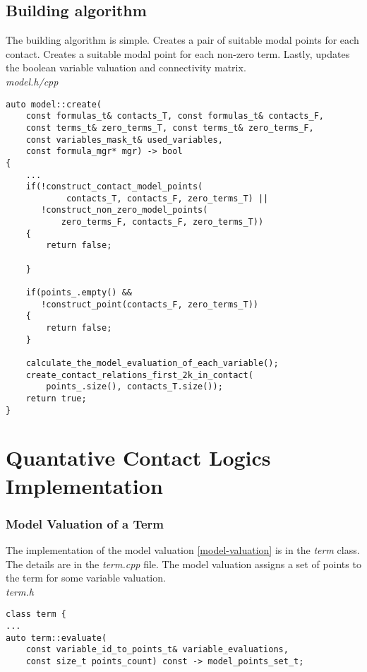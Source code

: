 \documentclass{article}
\begin{document}
	\subsection{Building algorithm}
	The building algorithm is simple. Creates a pair of suitable modal points for each contact. Creates a suitable modal point for each non-zero term. Lastly, updates the boolean variable valuation and connectivity matrix.
\\
\noindent
\textit{model.h/cpp}
\begin{lstlisting}
auto model::create(
	const formulas_t& contacts_T, const formulas_t& contacts_F,
	const terms_t& zero_terms_T, const terms_t& zero_terms_F,
	const variables_mask_t& used_variables,
	const formula_mgr* mgr) -> bool
{
    ...
    if(!construct_contact_model_points(
            contacts_T, contacts_F, zero_terms_T) ||
       !construct_non_zero_model_points(
           zero_terms_F, contacts_F, zero_terms_T))
    {
        return false;

    }

    if(points_.empty() &&
       !construct_point(contacts_F, zero_terms_T))
    {
        return false;
    }

    calculate_the_model_evaluation_of_each_variable();
    create_contact_relations_first_2k_in_contact(
        points_.size(), contacts_T.size());
    return true;
}
\end{lstlisting}

	\newpage
	\section{Quantative Contact Logics Implementation}

\newpage
	\subsubsection*{Model Valuation of a Term}
	The implementation of the model valuation \ref{model-valuation} is in the \textit{term} class. The details are in the \textit{term.cpp} file.
	The model valuation assigns a set of points to the term for some variable valuation.
\\
\noindent
\textit{term.h}
\begin{lstlisting}
class term {
...
auto term::evaluate(
	const variable_id_to_points_t& variable_evaluations,
	const size_t points_count) const -> model_points_set_t;
\end{lstlisting}	
\end{document}
